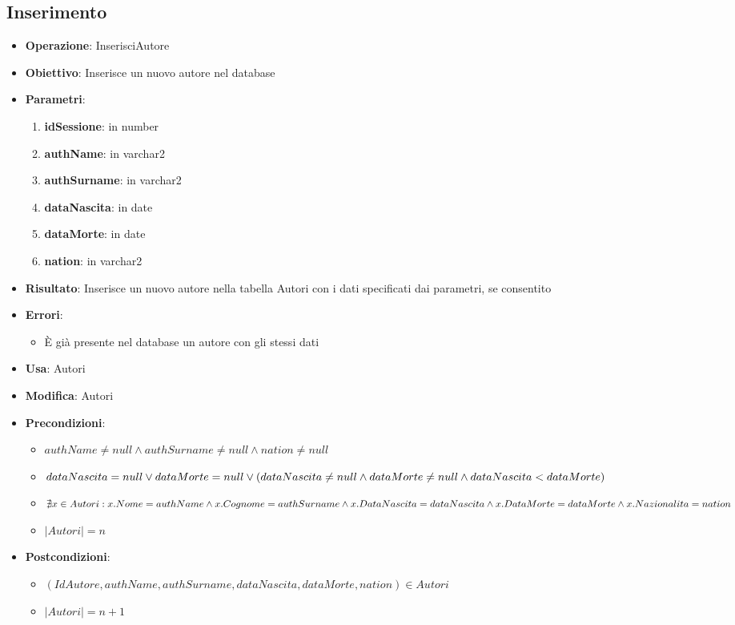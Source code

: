 \documentclass[a4paper,11pt]{article}
\begin{document}
\subsection{Inserimento}
\begin{itemize}
	\item \textbf{Operazione}: InserisciAutore
	\item \textbf{Obiettivo}: Inserisce un nuovo autore nel database
	\item \textbf{Parametri}:
	\begin{enumerate}
		\item \textbf{idSessione}: in number
		\item \textbf{authName}: in varchar2
		\item \textbf{authSurname}: in varchar2
		\item \textbf{dataNascita}: in date
		\item \textbf{dataMorte}: in date
		\item \textbf{nation}: in varchar2
	\end{enumerate}
	\item \textbf{Risultato}: Inserisce un nuovo autore nella tabella Autori con i dati specificati dai parametri, se consentito
	\item \textbf{Errori}: 
	\begin{itemize}
		\item È già presente nel database un autore con gli stessi dati
	\end{itemize}
	\item \textbf{Usa}: Autori
	\item \textbf{Modifica}: Autori
	\item \textbf{Precondizioni}:
	\begin{itemize}
		\item $authName \ne null \land authSurname \ne null \land nation \ne null$
		\item $dataNascita = null \\
			\lor dataMorte = null \\ 
			\lor (dataNascita \ne null \land dataMorte \ne null \land dataNascita < dataMorte)$
		\item $\nexists x \in Autori : x.Nome = authName \land x.Cognome = authSurname \\
		\land x.DataNascita = dataNascita \land x.DataMorte = dataMorte \\
		\land x.Nazionalita = nation$
		\item $|Autori| = n$
	\end{itemize}
	\item \textbf{Postcondizioni}:
	\begin{itemize}
		\item $(IdAutore,authName,authSurname,dataNascita,dataMorte,nation) \in Autori$
		\item $|Autori| = n + 1$
	\end{itemize}
\end{itemize}
\end{document}
